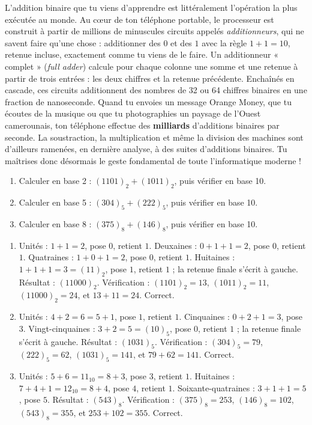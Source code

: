 \documentclass[11pt]{article}
\begin{document}
\begin{savaistu}
L'addition binaire que tu viens d'apprendre est littéralement l'opération la plus exécutée au monde. Au cœur de ton téléphone portable, le processeur est construit à partir de millions de minuscules circuits appelés \emph{additionneurs}, qui ne savent faire qu'une chose : additionner des $0$ et des $1$ avec la règle $1 + 1 = 10$, retenue incluse, exactement comme tu viens de le faire. Un additionneur « complet » (\emph{full adder}) calcule pour chaque colonne une somme et une retenue à partir de trois entrées : les deux chiffres et la retenue précédente. Enchaînés en cascade, ces circuits additionnent des nombres de 32 ou 64 chiffres binaires en une fraction de nanoseconde. Quand tu envoies un message Orange Money, que tu écoutes de la musique ou que tu photographies un paysage de l'Ouest camerounais, ton téléphone effectue des \textbf{milliards} d'additions binaires par seconde. La soustraction, la multiplication et même la division des machines sont d'ailleurs ramenées, en dernière analyse, à des suites d'additions binaires. Tu maîtrises donc désormais le geste fondamental de toute l'informatique moderne !
\end{savaistu}

\begin{exercice}
\begin{enumerate}
\item Calculer en base 2 : $(1101)_2 + (1011)_2$, puis vérifier en base 10.
\item Calculer en base 5 : $(304)_5 + (222)_5$, puis vérifier en base 10.
\item Calculer en base 8 : $(375)_8 + (146)_8$, puis vérifier en base 10.
\end{enumerate}
\end{exercice}

\begin{corrige}
\begin{enumerate}
\item Unités : $1+1 = 2$, pose $0$, retient $1$. Deuxaines : $0+1+1 = 2$, pose $0$, retient $1$. Quatraines : $1+0+1 = 2$, pose $0$, retient $1$. Huitaines : $1+1+1 = 3 = (11)_2$, pose $1$, retient $1$ ; la retenue finale s'écrit à gauche. Résultat : $(11000)_2$. Vérification : $(1101)_2 = 13$, $(1011)_2 = 11$, $(11000)_2 = 24$, et $13 + 11 = 24$. Correct.
\item Unités : $4+2 = 6 = 5+1$, pose $1$, retient $1$. Cinquaines : $0+2+1 = 3$, pose $3$. Vingt-cinquaines : $3+2 = 5 = (10)_5$, pose $0$, retient $1$ ; la retenue finale s'écrit à gauche. Résultat : $(1031)_5$. Vérification : $(304)_5 = 79$, $(222)_5 = 62$, $(1031)_5 = 141$, et $79 + 62 = 141$. Correct.
\item Unités : $5+6 = 11_{10} = 8+3$, pose $3$, retient $1$. Huitaines : $7+4+1 = 12_{10} = 8+4$, pose $4$, retient $1$. Soixante-quatraines : $3+1+1 = 5$, pose $5$. Résultat : $(543)_8$. Vérification : $(375)_8 = 253$, $(146)_8 = 102$, $(543)_8 = 355$, et $253 + 102 = 355$. Correct.
\end{enumerate}
\end{corrige}
\end{document}

